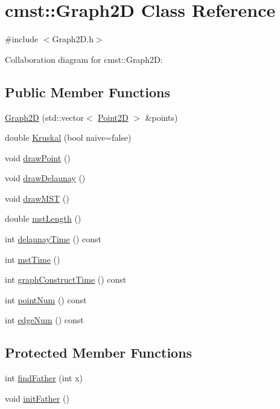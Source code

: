 \hypertarget{classcmst_1_1_graph2_d}{}\section{cmst::Graph2D Class Reference}
\label{classcmst_1_1_graph2_d}


{\ttfamily \#include $<$Graph2D.h$>$}



Collaboration diagram for cmst::Graph2D:
\subsection*{Public Member Functions}
\begin{DoxyCompactItemize}
\item 
\hyperlink{classcmst_1_1_graph2_d_a36cf583f9e2e59da2bed94c8569914d2}{Graph2D} (std::vector$<$ \hyperlink{classcmst_1_1_point2_d}{Point2D} $>$ \&points)
\item 
double \hyperlink{classcmst_1_1_graph2_d_ac3ce0434f4c42c2ed2b7c7861b32710f}{Kruskal} (bool naive=false)
\item 
void \hyperlink{classcmst_1_1_graph2_d_affec250ee22a067a28127b46ce976b90}{drawPoint} ()
\item 
void \hyperlink{classcmst_1_1_graph2_d_a2c4ed2ccd1fffc94c636929e531c4e3e}{drawDelaunay} ()
\item 
void \hyperlink{classcmst_1_1_graph2_d_a96e388b819b351c8564eed9aecf58f7d}{drawMST} ()
\item 
double \hyperlink{classcmst_1_1_graph2_d_aea22c23fdbb3b9e91671562cb19730ed}{mstLength} ()
\item 
int \hyperlink{classcmst_1_1_graph2_d_a93a1d4d5d2dd08796e37bcba6de79341}{delaunayTime} () const 
\item 
int \hyperlink{classcmst_1_1_graph2_d_a3b596946f310f7024036d2c6a18985a3}{mstTime} ()
\item 
int \hyperlink{classcmst_1_1_graph2_d_ad4756aa3f617493bd8b3f6ecfe099449}{graphConstructTime} () const 
\item 
int \hyperlink{classcmst_1_1_graph2_d_a0b18b38d5813b2fdbe8f5a8d6f92575d}{pointNum} () const 
\item 
int \hyperlink{classcmst_1_1_graph2_d_ae2474e4dd9964cd18fc9926a296c82fd}{edgeNum} () const 
\end{DoxyCompactItemize}
\subsection*{Protected Member Functions}
\begin{DoxyCompactItemize}
\item 
int \hyperlink{classcmst_1_1_graph2_d_a0b860daa24f288eea5f490e12fcb67e2}{findFather} (int x)
\item 
void \hyperlink{classcmst_1_1_graph2_d_a5de76dfe02b4a13e0d3fe9a5e7ea7285}{initFather} ()
\end{DoxyCompactItemize}
